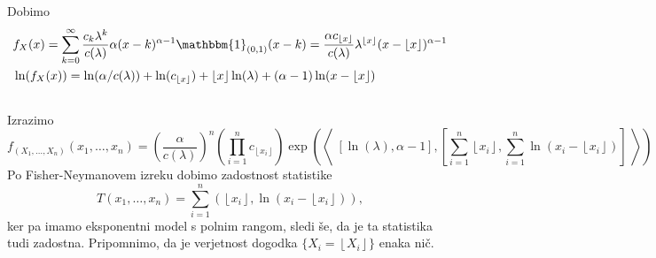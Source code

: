 \documentclass[ letterpaper, titlepage, fleqn]{article}
\newcommand{\adjscalar}[1]{\left\langle\;#1\;\right\rangle}
\newcommand{\ind}{\mathbbm{1}}
\providecommand{\floor}[1]{\left \lfloor #1 \right \rfloor }
\begin{document}
\subsection{}
Dobimo
\begin{equation*}
\begin{aligned}
&f_X(x) = \sum_{k=0}^\infty \frac{c_k\lambda^k}{c(\lambda)}  \alpha (x-k)^{\alpha-1} \ind_{(0,1)}(x-k) 
= \frac{\alpha c_{\floor{x}}}{c(\lambda)} \lambda^{\floor{x}} (x-\floor{x})^{\alpha-1} \\
&\ln(f_X(x)) = \ln(\alpha/c(\lambda)) + \ln(c_{\floor{x}}) + \floor{x}\ln(\lambda) + (\alpha-1)\ln(x - \floor{x})
\end{aligned}
\end{equation*}

\subsection{}
Izrazimo
\begin{equation*}
f_{(X_1, \dots, X_n)}(x_1, \dots, x_n) = \left(\frac{\alpha}{c(\lambda)}\right)^n \left(\prod_{i=1}^n c_{\floor{x_i}}\right)
\exp\left(\adjscalar{\left[\ln(\lambda), \alpha-1\right], \left[\sum_{i=1}^n \floor{x_i}, \sum_{i=1}^n \ln(x_i - \floor{x_i})\right]}\right)
\end{equation*}
Po Fisher-Neymanovem izreku dobimo zadostnost statistike 
$$T(x_1, \dots, x_n) = \sum_{i=1}^n (\floor{x_i}, \ln(x_i - \floor{x_i})),$$
ker pa imamo eksponentni model s polnim rangom, sledi še, da je ta statistika tudi zadostna. Pripomnimo, da je verjetnost dogodka $\{X_i = \floor{X_i}\}$ enaka nič.
\end{document}
